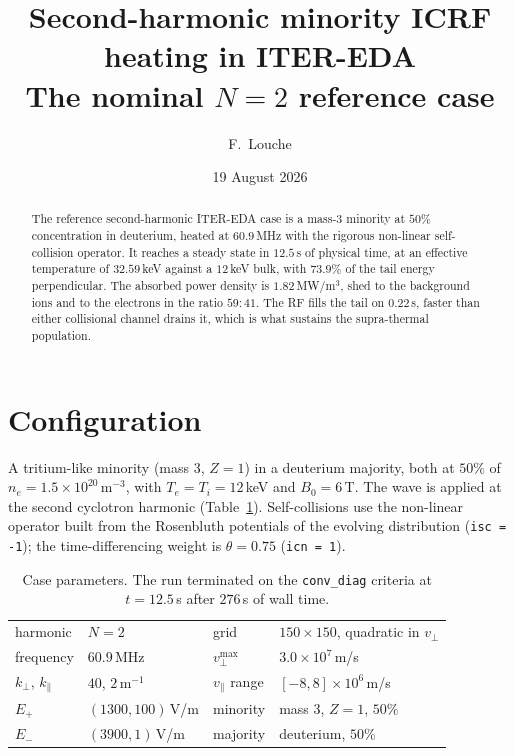 \documentclass[11pt,a4paper]{article}
\title{\vspace{-1.2cm}\textbf{\large Second-harmonic minority ICRF heating in ITER-EDA}\\[1mm]
\normalsize The nominal $N{=}2$ reference case}
\author{\normalsize F.~Louche}
\date{\normalsize 19 August 2026}
\newcommand{\code}[1]{\texttt{\small #1}}
\newcommand{\vperp}{v_\perp}
\newcommand{\vpar}{v_\parallel}
\begin{document}
\maketitle
\vspace{-0.9cm}

\begin{abstract}
\noindent\small
The reference second-harmonic ITER-EDA case is a mass-3 minority at $50\%$
concentration in deuterium, heated at $60.9\,$MHz with the rigorous non-linear
self-collision operator. It reaches a steady state in $12.5\,$s of physical
time, at an effective temperature of $32.59\,$keV against a $12\,$keV bulk, with
$73.9\%$ of the tail energy perpendicular. The absorbed power density is
$1.82\,$MW/m$^3$, shed to the background ions and to the electrons in the ratio
$59{:}41$. The RF fills the tail on $0.22\,$s, faster than either collisional
channel drains it, which is what sustains the supra-thermal population.
\end{abstract}

\vspace{-0.3cm}
\section{Configuration}

A tritium-like minority (mass 3, $Z{=}1$) in a deuterium majority, both at
$50\%$ of $n_e=1.5\times10^{20}\,$m$^{-3}$, with $T_e=T_i=12\,$keV and
$B_0=6\,$T. The wave is applied at the second cyclotron harmonic
(Table~\ref{tab:setup}). Self-collisions use the non-linear operator built from
the Rosenbluth potentials of the evolving distribution (\code{isc = -1}); the
time-differencing weight is $\theta=0.75$ (\code{icn = 1}).

\begin{table}[h]
\centering\small
\caption{Case parameters. The run terminated on the \code{conv\_diag} criteria
at $t=12.5\,$s after $276\,$s of wall time.}
\label{tab:setup}
\begin{tabular}{@{}llll@{}}
\toprule
harmonic & $N=2$ & grid & $150\times150$, quadratic in $\vperp$ \\
frequency & $60.9\,$MHz & $\vperp^{\max}$ & $3.0\times10^{7}\,$m/s \\
$k_\perp$, $k_\parallel$ & $40$, $2\,$m$^{-1}$ & $\vpar$ range & $[-8,8]\times10^{6}\,$m/s \\
$E_+$ & $(1300,100)\,$V/m & minority & mass 3, $Z=1$, $50\%$ \\
$E_-$ & $(3900,1)\,$V/m & majority & deuterium, $50\%$ \\
\bottomrule
\end{tabular}
\end{table}
\end{document}
